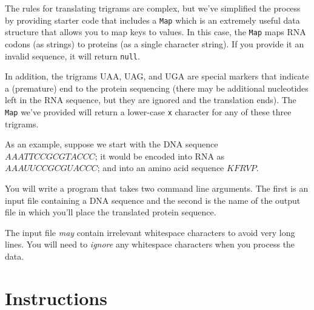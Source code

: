 \documentclass[12pt]{scrartcl}
\begin{document}
The rules for translating trigrams are complex, but we've simplified
the process by providing starter code that includes a \texttt{Map}
which is an extremely useful data structure that allows you to map
keys to values.  In this case, the \texttt{Map} maps
RNA codons (as strings) to proteins (as a single character string).  
If you provide it an invalid sequence, it will return \texttt{null}.

In addition, the trigrams UAA, UAG, and UGA are special markers that 
indicate a (premature) end to the protein sequencing (there may be 
additional nucleotides left in the RNA sequence, but they are ignored 
and the translation ends).  The \texttt{Map} we've provided will
return a lower-case \texttt{x} character for any of these three 
trigrams.

As an example, suppose we start with the DNA sequence $AAATTCCGCGTACCC$; 
it would be encoded into RNA as $AAAUUCCGCGUACCC$; and into an amino 
acid sequence $KFRVP$.

You will write a program that takes two command line arguments.  The
first is an input file containing a DNA sequence and the second is the
name of the output file in which you'll place the translated protein
sequence.  

The input file \emph{may} contain irrelevant whitespace characters to
avoid very long lines.  You will need to \emph{ignore} any whitespace
characters when you process the data.  

\section*{Instructions}
\end{document}
